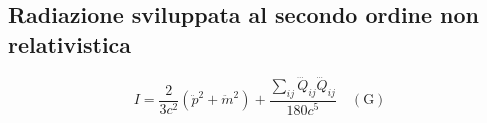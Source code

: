 \documentclass[11pt,a4paper]{report}
\begin{document}
		\subsection{Radiazione sviluppata al secondo ordine non relativistica}
			\begin{equation}
				I=\frac{2}{3c^2}(\ddot p^2+\ddot m^2)+\frac{\sum_{ij}\dddot Q_{ij}\dddot Q_{ij}}{180c^5}\quad(\textrm {G})
			\end{equation}
	
\end{document}
